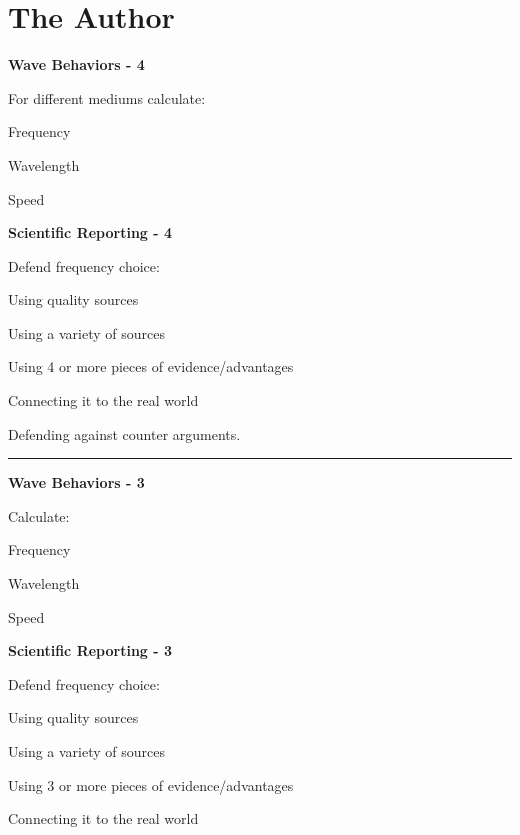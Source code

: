 \documentclass[14pt, fleqn, paper=letter, oneside]{scrartcl}
\newcommand{\maintitle}{The Author}
\begin{document}
\section*{\maintitle}

\begin{minipage}[t]{0.48\textwidth}
	\hfill \textbf{Wave Behaviors - 4}\hfill\mbox{}

	For different mediums calculate:
	\vspace{-3mm}
	\begin{checklist}[leftmargin=*]
		\item Frequency
		\item Wavelength
		\item Speed
	\end{checklist}
\end{minipage}
	\hfill\vline\hfill
\begin{minipage}[t]{0.48\textwidth}
	\hfill \textbf{Scientific Reporting - 4}\hfill\mbox{}
	
	Defend frequency choice:
	\vspace{-3mm}
	\begin{checklist}[leftmargin=*]
		\item Using quality sources
		\item Using a variety of sources
		\item Using 4 or more pieces of evidence/advantages
		\item Connecting it to the real world
		\item Defending against counter arguments.
	\end{checklist}
\end{minipage}

\vspace{2mm}
\rule{\textwidth}{1pt}


\noindent
\begin{minipage}[t]{0.48\textwidth}
	\hfill \textbf{Wave Behaviors - 3}\hfill\mbox{}

	Calculate:
	\vspace{-3mm}
	\begin{checklist}[leftmargin=*]
		\item Frequency
		\item Wavelength
		\item Speed
	\end{checklist}
\end{minipage}
	\hfill\vline\hfill
\begin{minipage}[t]{0.48\textwidth}
	\hfill \textbf{Scientific Reporting - 3}\hfill\mbox{}

	Defend frequency choice:
	\vspace{-3mm}
	\begin{checklist}[leftmargin=*]
		\item Using quality sources
		\item Using a variety of sources
		\item Using 3 or more pieces of evidence/advantages
		\item Connecting it to the real world
	\end{checklist}
\end{minipage}
\end{document}
